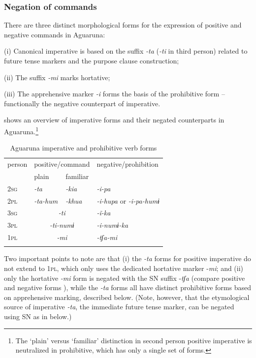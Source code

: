 \documentclass[output=paper,colorlinks,citecolor=brown,draft]{langscibook}
\begin{document}
\subsubsection{Negation of commands}\label{sec:agu:2.2.1}

There are three distinct morphological forms for the expression of positive and negative commands in Aguaruna:

(i)  Canonical imperative is based on the suffix \textit{{}-ta} (\textit{{}-ti} in third person) related to future tense markers and the purpose clause construction;

(ii)  The suffix \textit{{}-mi} marks hortative;

(iii) The apprehensive marker \textit{{}-i} forms the basis of the prohibitive form – functionally the negative counterpart of imperative.

 shows an overview of imperative forms and their negated counterparts in Aguaruna.\footnote{The ‘plain’ versus ‘familiar’ distinction in second person positive imperative is neutralized in prohibitive, which has only a single set of forms.}

\begin{table}
\begin{tabular}{llll}
\lsptoprule
{person} & \multicolumn{2}{c}{{positive/command}} & {negative/prohibition}\\
               & {plain}  & {{familiar}} & \\
               \midrule 
{\scshape 2sg} & \textit{-ta}       & \textit{-kia}     & \textit{-i-pa}\\
{\scshape 2pl} & \textit{-ta-hum}   & \textit{-khua}    & {\textit{-i-hupa} or \textit{-i-pa-humɨ}}\\
{\scshape 3sg} & \multicolumn{2}{c}{\textit{-ti}}       & \textit{-ĩ-ka}\\
{\scshape 3pl} & \multicolumn{2}{c}{\textit{-ti-numɨ}}  & \textit{-i-numɨ-ka}\\
{\scshape 1pl} & \multicolumn{2}{c}{\textit{-mi}}       & \textit{-tʃa-mi}\\
\lspbottomrule
\end{tabular}
\caption{Aguaruna imperative and prohibitive verb forms \citep[68]{Overall2017b}}
\label{tab:agu:2}
\end{table}

Two important points to note are that (i) the \textit{{}-ta} forms for positive imperative do not extend to \textsc{1pl}, which only uses the dedicated hortative marker -\textit{mi}; and (ii) only the hortative \textit{{}-mi} form is negated with the SN suffix -\textit{tʃa} (compare positive and negative forms ), while the \textit{{}-ta} forms all have distinct prohibitive forms based on apprehensive marking, described below. (Note, however, that the etymological source of imperative \textit{{}-ta}, the immediate future tense marker, can be negated using SN as in  below.)
\end{document}

